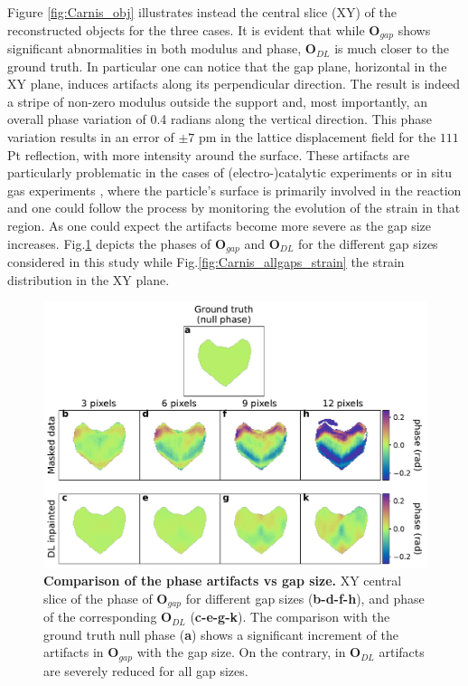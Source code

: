 Figure \ref{fig:Carnis_obj} illustrates instead the central slice (XY) of the reconstructed objects for 
the three cases. It is evident that while $\mathbf{O}_{gap}$ shows significant abnormalities in both modulus and phase, 
$\mathbf{O}_{DL}$ is much closer to the ground truth. In particular one can notice that the gap plane, horizontal in the 
XY plane, induces artifacts along its perpendicular direction. The result is indeed a stripe of non-zero modulus outside 
the support and, most importantly, an overall phase variation of 0.4 radians along the vertical direction. This phase variation
results in an error of $\pm 7$ pm in the lattice displacement field for the $111$ Pt reflection, with more intensity around the 
surface. These artifacts are particularly problematic in the cases of (electro-)catalytic experiments \cite{atlan_imaging_2023}
or in situ gas experiments \cite{Ulvestad2015, Kim2018,PhysRevLett.123.246001, Abuin2019, Dupraz_2022}, 
where the particle's surface is primarily involved in the reaction and one could follow the process by monitoring the evolution
of the strain in that region. As one could expect the artifacts become more severe as the gap size increases. Fig.\ref{fig:Carnis_allgaps} depicts 
the phases of $\mathbf{O}_{gap}$ and $\mathbf{O}_{DL}$ for the different gap sizes considered in this study while 
Fig.\ref{fig:Carnis_allgaps_strain} the strain distribution in the XY plane. 

\begin{figure}[H]
    \centering
    \includegraphics[width=\textwidth]{figures/Inpainting/strain_comparison_allGaps-1.pdf}
    \caption{\textbf{Comparison of the phase artifacts vs gap size.} XY central slice of the phase of $\mathbf{O}_{gap}$ 
    for different gap sizes (\textbf{b-d-f-h}), and phase of the corresponding $\mathbf{O}_{DL}$ (\textbf{c-e-g-k}). 
    The comparison with the ground truth null phase (\textbf{a}) shows a significant increment of the artifacts in  
    $\mathbf{O}_{gap}$ with the gap size. On the contrary, in $\mathbf{O}_{DL}$ artifacts are severely reduced for 
    all gap sizes. }
    \label{fig:Carnis_allgaps}
\end{figure}


